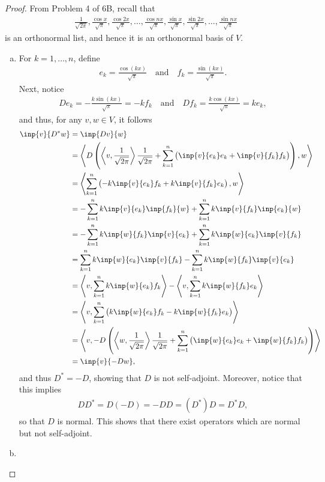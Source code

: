 \documentclass{extarticle}
\begin{document}
\begin{proof}
From Problem 4 of 6B, recall that
\begin{align*}
\frac{1}{\sqrt{2\pi}}, \frac{\cos x}{\sqrt{\pi}}, \frac{\cos 2x}{\sqrt{\pi}}, \dots, \frac{\cos nx}{\sqrt{\pi}}, \frac{\sin x}{\sqrt{\pi}}, \frac{\sin 2x}{\sqrt{\pi}}, \dots, \frac{\sin nx}{\sqrt{\pi}}
\end{align*}
is an orthonormal list, and hence it is an orthonormal basis of $V$.  
\begin{enumerate}[(a)]
\item For $k = 1,\dots, n$, define
\begin{align*}
e_k = \frac{\cos(kx)}{\sqrt{\pi}}\quad\text{and}\quad f_k= \frac{\sin(kx)}{\sqrt{\pi}}.
\end{align*}
Next, notice
\begin{align*}
De_k = -\frac{k\sin(kx)}{\sqrt{\pi}} = -kf_k\quad\text{and}\quad Df_k = \frac{k\cos(kx)}{\sqrt{\pi}} = ke_k,
\end{align*}
and thus, for any $v,w\in V$, it follows
\begin{align*}
\inp{v}{D^\ast w} &= \inp{Dv}{w}\\
&= \left\langle D\left(\left\langle v, \frac{1}{\sqrt{2\pi}}\right\rangle \frac{1}{\sqrt{2\pi}}+\sum_{k=1}^n\left(\inp{v}{e_k}e_k + \inp{v}{f_k}f_k\right)\right), w\right\rangle\\
&= \left\langle \sum_{k=1}^n\left(-k\inp{v}{e_k}f_k + k\inp{v}{f_k}e_k\right), w\right\rangle\\
&= -\sum_{k = 1}^nk\inp{v}{e_k}\inp{f_k}{w} + \sum_{k = 1}^nk\inp{v}{f_k}\inp{e_k}{w}\\
&= -\sum_{k= 1}^nk\inp{w}{f_k}\inp{v}{e_k} +  \sum_{k = 1}^nk\inp{w}{e_k}\inp{v}{f_k}\\
&= \sum_{k = 1}^nk\inp{w}{e_k}\inp{v}{f_k} - \sum_{k= 1}^nk\inp{w}{f_k}\inp{v}{e_k}\\
&= \left\langle v, \sum_{k=1}^nk\inp{w}{e_k}f_k \right\rangle - \left\langle v, \sum_{k=1}^nk\inp{w}{f_k}e_k \right\rangle\\
&= \left\langle v, \sum_{k=1}^n\left(k\inp{w}{e_k}f_k - k\inp{w}{f_k}e_k \right)\right\rangle\\
&= \left\langle v,  -D\left(\left\langle w, \frac{1}{\sqrt{2\pi}}\right\rangle \frac{1}{\sqrt{2\pi}}+\sum_{k=1}^n\left(\inp{w}{e_k}e_k + \inp{w}{f_k}f_k\right)\right)\right\rangle\\
&= \inp{v}{-Dw},
\end{align*}
and thus $D^\ast = -D$, showing that $D$ is not self-adjoint.  Moreover, notice that this implies
\begin{align*}
DD^\ast = D(-D) = -DD = (D^\ast)D = D^\ast D,
\end{align*}
so that $D$ is normal.  This shows that there exist operators which are normal but not self-adjoint.

\item 
\end{enumerate}

\end{proof}
\end{document}
